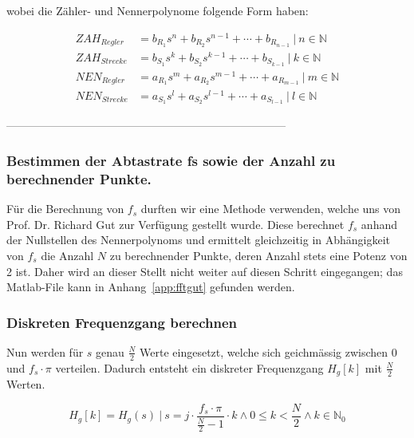 wobei die Z\"ahler- und Nennerpolynome folgende Form haben:

\begin{align*}
    ZAH_{Regler}  & = b_{R_1} s^n  + b_{R_2} s^{n-1}  + \dotsb  + b_{R_{n-1}}     ~\biggr \rvert~ n \in  \mathbb{N} \\
    ZAH_{Strecke} & = b_{S_1} s^k  + b_{S_2} s^{k-1}  + \dotsb  + b_{S_{k-1}}     ~\biggr \rvert~ k \in  \mathbb{N}  \\
    NEN_{Regler}  & = a_{R_1} s^m  + a_{R_2} s^{m-1}  + \dotsb  + a_{R_{m-1}}     ~\biggr \rvert~ m \in  \mathbb{N}  \\
    NEN_{Strecke} & = a_{S_1} s^l  + a_{S_2} s^{l-1}  + \dotsb  + a_{S_{l-1}}     ~\biggr \rvert~ l \in  \mathbb{N}
\end{align*}


 --------------------------------------------------------------------------- %
\subsubsection*{Bestimmen der Abtastrate fs sowie der Anzahl zu berechnender Punkte.}
F\"ur die Berechnung von $f_s$ durften  wir eine Methode verwenden, welche uns
von  Prof. Dr. Richard Gut  zur  Verf\"ugung  gestellt wurde. Diese  berechnet
$f_s$ anhand der Nullstellen des  Nennerpolynoms und ermittelt gleichzeitig in
Abh\"angigkeit von $f_s$  die Anzahl $N$ zu berechnender  Punkte, deren Anzahl
stets eine  Potenz von  2 ist. Daher  wird an dieser  Stellt nicht  weiter auf
diesen Schritt  eingegangen; das  Matlab-File kann  in Anhang~\ref{app:fftgut}
gefunden werden.


\subsubsection*{Diskreten Frequenzgang berechnen}

Nun  werden  f\"ur  $s$  genau $\frac{N}{2}$  Werte  eingesetzt,  welche  sich
geichm\"assig zwischen 0  und $f_s \cdot \pi$  verteilen. Dadurch entsteht ein
diskreter Frequenzgang $H_g[k]$ mit $\frac{N}{2}$ Werten.

\begin{equation*}
    H_g[k] = H_g(s) ~\biggr \rvert~ s=j \cdot \frac{f_s \cdot \pi}{\frac{N}{2} - 1} \cdot k \land 0 \leq k < \frac{N}{2} \land k \in \mathbb{N}_0
\end{equation*}


